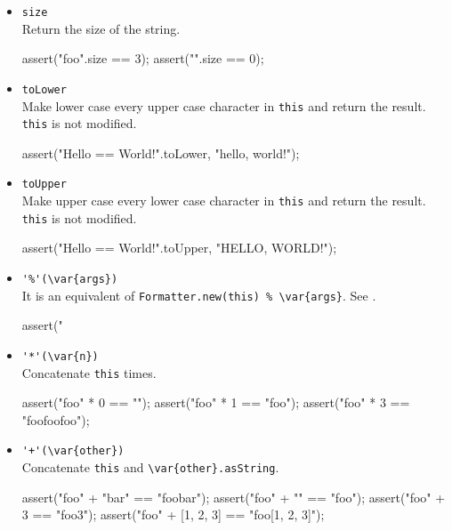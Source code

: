 \begin{itemize}
\item \lstinline|size|\\
  Return the size of the string.
\begin{urbiscript}[firstnumber=last]
assert("foo".size == 3);
assert("".size == 0);
\end{urbiscript}

\item \lstinline|toLower|\\
  Make lower case every upper case character in \lstinline|this| and
  return the result.  \lstinline|this| is not modified.
\begin{urbiscript}[firstnumber=last]
assert("Hello == World!".toLower, "hello, world!");
\end{urbiscript}

\item \lstinline|toUpper|\\
  Make upper case every lower case character in \lstinline|this| and
  return the result.  \lstinline|this| is not modified.
\begin{urbiscript}[firstnumber=last]
assert("Hello == World!".toUpper, "HELLO, WORLD!");
\end{urbiscript}

\item \lstinline|'%'(\var{args})|\\
  It is an equivalent of \lstinline|Formatter.new(this) % \var{args}|.
  See .
\begin{urbiscript}[firstnumber=last]
assert("%
\end{urbiscript}

\item \lstinline|'*'(\var{n})|\\
  Concatenate \lstinline|this|  times.
\begin{urbiscript}[firstnumber=last]
assert("foo" * 0 == "");
assert("foo" * 1 == "foo");
assert("foo" * 3 == "foofoofoo");
\end{urbiscript}

\item \lstinline|'+'(\var{other})|\\
  Concatenate \lstinline|this| and \lstinline|\var{other}.asString|.
\begin{urbiscript}[firstnumber=last]
assert("foo" + "bar" == "foobar");
assert("foo" + "" == "foo");
assert("foo" + 3 == "foo3");
assert("foo" + [1, 2, 3] == "foo[1, 2, 3]");
\end{urbiscript}


\end{itemize}
